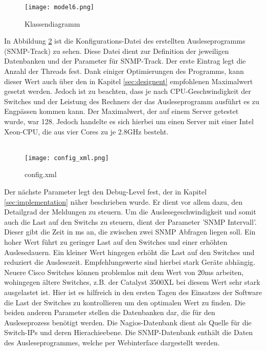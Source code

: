 \begin{figure}[H]
\centering
\texttt{[image: model6.png]}
\caption[]{Klassendiagramm}
\label{fig:classdia6}
\end{figure}

\clearpage

\label{sec:config}

In Abbildung \ref{fig:config_xml} ist die Konfigurations-Datei des erstellten Ausleseprogramms (SNMP-Track) zu sehen.
Diese Datei dient zur Definition der jeweiligen Datenbanken und der Parameter für SNMP-Track.
Der erste Eintrag legt die Anzahl der Threads fest. Dank einiger Optimierungen des Programms, kann dieser Wert auch über den in Kapitel \ref{sec:designent} empfohlenen Maximalwert gesetzt werden.
Jedoch ist zu beachten, dass je nach CPU-Geschwindigkeit der Switches und der Leistung des Rechners der das Ausleseprogramm ausführt es zu Engpässen kommen kann.
Der Maximalwert, der auf einem Server getestet wurde, war 128. Jedoch handelte es sich hierbei um einen Server mit einer Intel Xeon-CPU, die aus vier Cores zu je 2.8GHz besteht.\\\\

\begin{figure}[H]
\centering
\texttt{[image: config\_xml.png]}
\caption[]{config.xml}
\label{fig:config_xml}
\end{figure}

Der nächste Parameter legt den Debug-Level fest, der in Kapitel \ref{sec:implementation} näher beschrieben wurde.
Er dient vor allem dazu, den Detailgrad der Meldungen zu steuern.
Um die Auslesegeschwindigkeit und somit auch die Last auf den Switchs zu steuern, dient der Parameter 'SNMP Intervall'.
Dieser gibt die Zeit in ms an, die zwischen zwei SNMP Abfragen liegen soll. Ein hoher Wert führt zu geringer Last auf den Switches und einer erhöhten Auslesedauern.
Ein kleiner Wert hingegen erhöht die Last auf den Switches und reduziert die Auslesezeit.
Empfehlungswerte sind hierbei stark Geräte abhängig. Neuere Cisco Switches können problemlos mit dem Wert von 20ms arbeiten, wohingegen ältere Switches, z.B. der Catalyst 3500XL bei diesem Wert sehr stark ausgelastet ist.
Hier ist es hilfreich in den ersten Tagen des Einsatzes der Software die Last der Switches zu kontrollieren um den optimalen Wert zu finden.
Die beiden anderen Parameter stellen die Datenbanken dar, die für den Ausleseprozess benötigt werden.
Die Nagios-Datenbank dient als Quelle für die Switch-IPs und deren Hierachieebene.
Die SNMP-Datenbank enthält die Daten des Ausleseprogrammes, welche per Webinterface dargestellt werden.


